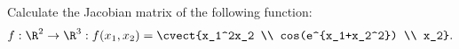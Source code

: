 

Calculate the Jacobian matrix of the following function:
\[
f:\R^2 \to \R^3: f(x_1,x_2)= \cvect{x_1^2x_2 \\ cos(e^{x_1+x_2^2}) \\ x_2}.
\]



